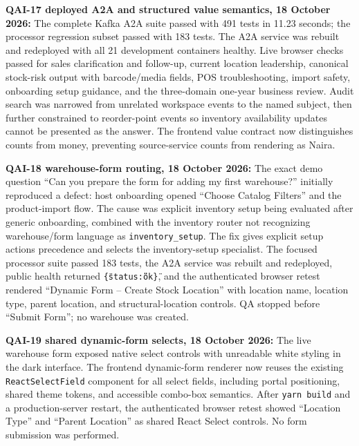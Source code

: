 \documentclass[10pt]{article}
\begin{document}
\colorbox{mist}{\parbox{0.96\textwidth}{\textbf{QAI-17 deployed A2A and structured value semantics, 18 October 2026:} The complete Kafka A2A suite passed with 491 tests in 11.23 seconds; the processor regression subset passed with 183 tests. The A2A service was rebuilt and redeployed with all 21 development containers healthy. Live browser checks passed for sales clarification and follow-up, current location leadership, canonical stock-risk output with barcode/media fields, POS troubleshooting, import safety, onboarding setup guidance, and the three-domain one-year business review. Audit search was narrowed from unrelated workspace events to the named subject, then further constrained to reorder-point events so inventory availability updates cannot be presented as the answer. The frontend value contract now distinguishes counts from money, preventing source-service counts from rendering as Naira.}}

\colorbox{mist}{\parbox{0.96\textwidth}{\textbf{QAI-18 warehouse-form routing, 18 October 2026:} The exact demo question ``Can you prepare the form for adding my first warehouse?'' initially reproduced a defect: host onboarding opened ``Choose Catalog Filters'' and the product-import flow. The cause was explicit inventory setup being evaluated after generic onboarding, combined with the inventory router not recognizing warehouse/form language as \texttt{inventory\_setup}. The fix gives explicit setup actions precedence and selects the inventory-setup specialist. The focused processor suite passed 183 tests, the A2A service was rebuilt and redeployed, public health returned \texttt{\{\"status\":\"ok\"\}}, and the authenticated browser retest rendered ``Dynamic Form -- Create Stock Location'' with location name, location type, parent location, and structural-location controls. QA stopped before ``Submit Form''; no warehouse was created.}}

\colorbox{mist}{\parbox{0.96\textwidth}{\textbf{QAI-19 shared dynamic-form selects, 18 October 2026:} The live warehouse form exposed native select controls with unreadable white styling in the dark interface. The frontend dynamic-form renderer now reuses the existing \texttt{ReactSelectField} component for all select fields, including portal positioning, shared theme tokens, and accessible combo-box semantics. After \texttt{yarn build} and a production-server restart, the authenticated browser retest showed ``Location Type'' and ``Parent Location'' as shared React Select controls. No form submission was performed.}}
\end{document}
